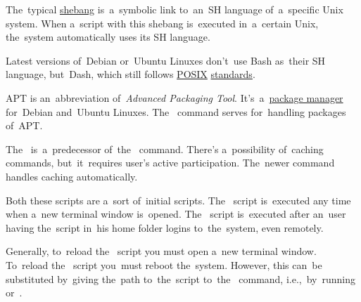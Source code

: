 \noindent The~typical \hyperref[shebang]{shebang}  is~a~symbolic link to~an~SH language of~a~specific Unix system.
When a~script with this shebang is~executed in~a~certain Unix, the~system automatically uses its SH language.

\warning Latest versions of~Debian or~Ubuntu Linuxes don't~use Bash as~their SH language, but~Dash, which still follows \hyperref[posix]{POSIX} \hyperref[protocolstandard]{standards}.

\label{linuxapt}
APT is an~abbreviation of~\textit{Advanced Packaging Tool}.
It's~a~\hyperref[packagemanager]{package manager} for~Debian and~Ubuntu Linuxes.
The~ command serves for~handling packages of~APT\@.

The~ is~a~predecessor of~the~ command.
There's a~possibility of~caching  commands, but~it~requires user's active participation.
The~newer  command handles caching automatically.

Both these scripts are a~sort of~initial scripts.
The~ script is~executed any time when a~new terminal window is~opened.
The~ script is~executed after an~user having the~script in~his home folder logins to~the~system, even remotely.

Generally, to~reload the~ script you must open a~new terminal window.
To~reload the~ script you~must reboot the~system.
However, this can~be substituted by~giving the~path to~the~script to~the~ command, i.e.,~by~running  or~.
